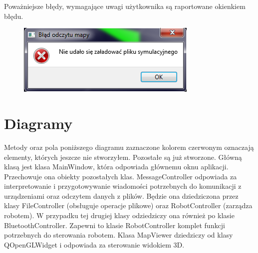 \documentclass[a4paper,12pt]{article}
\begin{document}
Poważniejsze błędy, wymagające uwagi użytkownika są raportowane okienkiem błędu. 
\begin{figure} [H]
\centering
\includegraphics{error_screen.png}
\end{figure}





\section{Diagramy}
Metody oraz pola poniższego diagramu zaznaczone kolorem czerwonym oznaczają elementy, których jeszcze nie stworzyłem. Pozostałe są już stworzone.
Główną klasą jest klasa MainWindow, która odpowiada głównemu oknu aplikacji. Przechowuje ona obiekty pozostałych klas. 
MessageController odpowiada za interpretowanie i przygotowywanie wiadomości potrzebnych do komunikacji z urządzeniami oraz odczytem danych z plików.
Będzie ona dziedziczona przez klasy FileController (obsługuje operacje plikowe) oraz RobotController (zarządza robotem). 
W przypadku tej drugiej klasy odziedziczy ona również po klasie BluetoothController. Zapewni to klasie RobotController komplet funkcji potrzebnych
do sterowania robotem. 
Klasa MapViewer dziedziczy od klasy QOpenGLWidget i odpowiada za sterowanie widokiem 3D.




\end{document}
